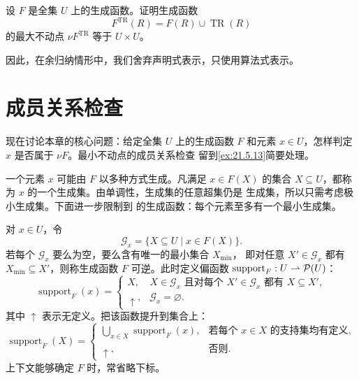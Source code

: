 \begin{exercise}[\(\star\)]
\label{ex:21.4.2}
设 \(F\) 是全集 \(U\) 上的生成函数。证明生成函数
\[
F^{\operatorname{TR}}(R)=F(R)\cup\operatorname{TR}(R)
\]
的最大不动点 \(\nu F^{\operatorname{TR}}\) 等于 \(U\times U\)。
\end{exercise}

因此，在余归纳情形中，我们舍弃声明式表示，只使用算法式表示。

\section{成员关系检查}
\label{sec:21.5}

现在讨论本章的核心问题：给定全集 \(U\) 上的生成函数 \(F\) 和元素
\(x\in U\)，怎样判定 \(x\) 是否属于 \(\nu F\)。最小不动点的成员关系检查
留到\cref{ex:21.5.13}简要处理。


一个元素 \(x\) 可能由 \(F\) 以多种方式生成。凡满足 \(x\in F(X)\) 的集合
\(X\subseteq U\)，都称为 \(x\) 的一个生成集。由单调性，生成集的任意超集仍是
生成集，所以只需考虑极小生成集。下面进一步限制到
的生成函数：每个元素至多有一个最小生成集。

\begin{definition}
\label{def:21.5.1}
对 \(x\in U\)，令
\[
\mathcal G_x=\{X\subseteq U\mid x\in F(X)\}.
\]
若每个 \(\mathcal G_x\) 要么为空，要么含有唯一的最小集合 \(X_{\min}\)，
即对任意 \(X'\in\mathcal G_x\) 都有 \(X_{\min}\subseteq X'\)，则称生成函数
\(F\) 可逆。此时定义偏函数
\(\operatorname{support}_F:U\rightharpoonup\mathcal{P}(U)\)：
\[
\operatorname{support}_F(x)=
\begin{cases}
X,&X\in\mathcal G_x\text{ 且对每个 }X'\in\mathcal G_x\text{ 都有 }X\subseteq X',\\
\uparrow,&\mathcal G_x=\varnothing.
\end{cases}
\]
其中 \(\uparrow\) 表示无定义。把该函数提升到集合上：
\[
\operatorname{support}_F(X)=
\begin{cases}
\displaystyle\bigcup_{x\in X}\operatorname{support}_F(x),
  &\text{若每个 }x\in X\text{ 的支持集均有定义},\\
\uparrow,&\text{否则}.
\end{cases}
\]
上下文能够确定 \(F\) 时，常省略下标。
\end{definition}

